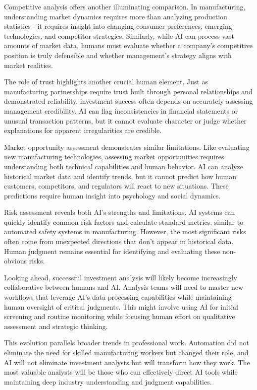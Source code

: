 \documentclass[
  Letterpaper,
]{scrbook}
\begin{document}
Competitive analysis offers another illuminating comparison. In
manufacturing, understanding market dynamics requires more than
analyzing production statistics - it requires insight into changing
consumer preferences, emerging technologies, and competitor strategies.
Similarly, while AI can process vast amounts of market data, humans must
evaluate whether a company's competitive position is truly defensible
and whether management's strategy aligns with market realities.

The role of trust highlights another crucial human element. Just as
manufacturing partnerships require trust built through personal
relationships and demonstrated reliability, investment success often
depends on accurately assessing management credibility. AI can flag
inconsistencies in financial statements or unusual transaction patterns,
but it cannot evaluate character or judge whether explanations for
apparent irregularities are credible.

Market opportunity assessment demonstrates similar limitations. Like
evaluating new manufacturing technologies, assessing market
opportunities requires understanding both technical capabilities and
human behavior. AI can analyze historical market data and identify
trends, but it cannot predict how human customers, competitors, and
regulators will react to new situations. These predictions require human
insight into psychology and social dynamics.

Risk assessment reveals both AI's strengths and limitations. AI systems
can quickly identify common risk factors and calculate standard metrics,
similar to automated safety systems in manufacturing. However, the most
significant risks often come from unexpected directions that don't
appear in historical data. Human judgment remains essential for
identifying and evaluating these non-obvious risks.

Looking ahead, successful investment analysis will likely become
increasingly collaborative between humans and AI. Analysis teams will
need to master new workflows that leverage AI's data processing
capabilities while maintaining human oversight of critical judgments.
This might involve using AI for initial screening and routine monitoring
while focusing human effort on qualitative assessment and strategic
thinking.

This evolution parallels broader trends in professional work. Automation
did not eliminate the need for skilled manufacturing workers but changed
their role, and AI will not eliminate investment analysts but will
transform how they work. The most valuable analysts will be those who
can effectively direct AI tools while maintaining deep industry
understanding and judgment capabilities.
\end{document}
